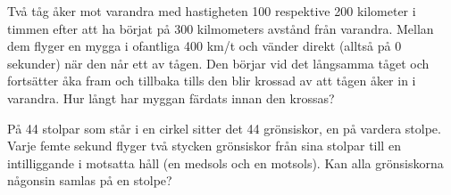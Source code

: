 \begin{problem}
	Två tåg åker mot varandra med hastigheten 100 respektive 200 kilometer i timmen efter att ha börjat på 300 kilmometers avstånd från varandra. Mellan dem flyger en mygga i ofantliga 400 km/t och vänder direkt (alltså på 0 sekunder) när den når ett av tågen. Den börjar vid det långsamma tåget och fortsätter åka fram och tillbaka tills den blir krossad av att tågen åker in i varandra. Hur långt har myggan färdats innan den krossas?
\end{problem}



\setcounter{theorem}{0}
\setcounter{section}{\thesection+1} %

\begin{problem}
	På 44 stolpar som står i en cirkel sitter det 44 grönsiskor, en på vardera stolpe. Varje femte sekund flyger två stycken grönsiskor från sina stolpar till en intilliggande i motsatta håll (en medsols och en motsols). Kan alla grönsiskorna någonsin samlas på en stolpe?
\end{problem}




